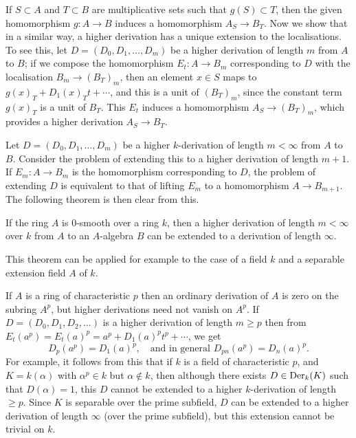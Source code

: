 If $S \subset A$ and $T \subset B$ are multiplicative sets such that $g(S) \subset T$, then the
given homomorphism $g\colon A \to B$ induces a homomorphism $A_S \to B_T$. Now we show
that in a similar way, a higher derivation has a unique extension to the
localisations. To see this, let $D = (D_0, D_1, \ldots, D_m)$ be a higher derivation of
length $m$ from $A$ to $B$; if we compose the homomorphism $E_t\colon A \to B_m$
corresponding to $D$ with the localisation $B_m \to (B_T)_m$, then an element $x \in S$
maps to $g(x)_T + D_1(x)_T t + \cdots$, and this is a unit of $(B_T)_m$, since the
constant term $g(x)_T$ is a unit of $B_T$. This $E_t$ induces a homomorphism
$A_S \to (B_T)_m$, which provides a higher derivation $A_S \to B_T$.

Let $D = (D_0, D_1, \ldots, D_m)$ be a higher $k$-derivation of length $m < \infty$ from $A$
to $B$. Consider the problem of extending this to a higher derivation of length
$m + 1$. If $E_m\colon A \to B_m$ is the homomorphism corresponding to $D$, the problem
of extending $D$ is equivalent to that of lifting $E_m$ to a homomorphism
$A \to B_{m+1}$. The following theorem is then clear from this.

\begin{theorem}\label{thm:27.1}
If the ring $A$ is 0-smooth over a ring $k$, then a higher derivation of length
$m < \infty$ over $k$ from $A$ to an $A$-algebra $B$ can be extended to a derivation of
length $\infty$.
\end{theorem}

This theorem can be applied for example to the case of a field $k$ and a separable
extension field $A$ of $k$.

If $A$ is a ring of characteristic $p$ then an ordinary derivation of $A$ is zero on
the subring $A^p$, but higher derivations need not vanish on $A^p$. If
$D = (D_0, D_1, D_2, \ldots)$ is a higher derivation of length $m \ge p$ then from
$E_t(a^p) = E_t(a)^p = a^p + D_1(a)^p t^p + \cdots$, we get
\[
  D_p(a^p) = D_1(a)^p, \quad \text{and in general } D_{pn}(a^p) = D_n(a)^p.
\]
For example, it follows from this that if $k$ is a field of characteristic $p$, and
$K = k(\alpha)$ with $\alpha^p \in k$ but $\alpha \notin k$, then although there exists
$D \in \operatorname{Der}_k(K)$ such that $D(\alpha) = 1$, this $D$ cannot be extended to a higher
$k$-derivation of length $\ge p$. Since $K$ is separable over the prime subfield, $D$
can be extended to a higher derivation of length $\infty$ (over the prime subfield),
but this extension cannot be trivial on $k$.


